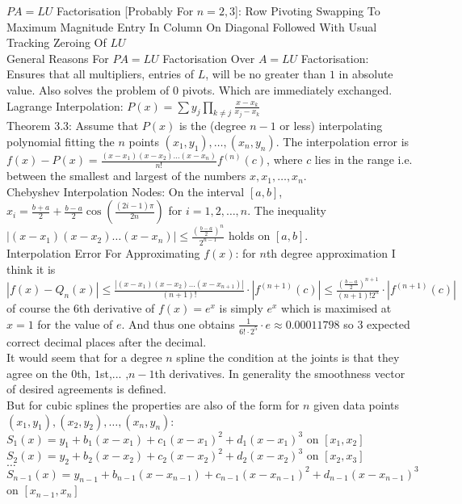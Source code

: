 $PA=LU$ Factorisation [Probably For $n=2,3$]: Row Pivoting Swapping To Maximum Magnitude Entry In Column On Diagonal Followed With Usual Tracking Zeroing Of $LU$ \\
General Reasons For $PA=LU$ Factorisation Over $A=LU$ Factorisation: \\
Ensures that all multipliers, entries of $L$, will be no greater than $1$ in absolute value. Also solves the problem of $0$ pivots. Which are immediately exchanged. \\
Lagrange Interpolation: $P(x) = \sum y_j \prod_{k \neq j} \frac{x-x_k}{x_j-x_k}$ \\
Theorem 3.3: Assume that $P(x)$ is the (degree $n-1$ or less) interpolating polynomial fitting the $n$ points $(x_1,y_1),\dots,(x_n,y_n)$. The interpolation error is $f(x)-P(x) = \frac{(x-x_1)(x-x_2)\dots (x-x_n)}{n!} f^{(n)}(c)$, where $c$ lies in the range i.e. between the smallest and largest of the numbers $x,x_1,\dots,x_n$. \\
Chebyshev Interpolation Nodes: On the interval $[a,b]$, $x_i = \frac{b+a}{2} + \frac{b-a}{2} \cos \left( \frac{(2 i-1)\pi}{2n} \right)$ for $i=1,2,\dots ,n$. The inequality $|(x-x_1)(x-x_2) \dots (x-x_n)| \le \frac{ \left( \frac{b-a}{2} \right)^n }{2^{n-1}}$ holds on $[a,b]$. \\
Interpolation Error For Approximating $f(x)$: for $n$th degree approximation I think it is $|f(x)-Q_n(x)| \le \frac{|(x-x_1)(x-x_2) \dots (x-x_{n+1})|}{(n+1)!} \cdot |f^{(n+1)}(c)| \le \frac{\left( \frac{b-a}{2} \right)^{n+1}}{(n+1)! 2^n} \cdot |f^{(n+1)}(c)|$ of course the $6$th derivative of $f(x)=e^x$ is simply $e^x$ which is maximised at $x=1$ for the value of $e$. And thus one obtains $\frac{1}{6! \cdot 2^5} \cdot e \approx 0.00011798$ so $3$ expected correct decimal places after the decimal. \\
It would seem that for a degree $n$ spline the condition at the joints is that they agree on the $0$th, $1$st,... ,$n-1$th derivatives. In generality the smoothness vector of desired agreements is defined. \\
But for cubic splines the properties are also of the form for $n$ given data points $(x_1,y_1),(x_2,y_2),\dots,(x_n,y_n)$: \\
$S_1(x)=y_1+b_1(x-x_1)+c_1(x-x_1)^2+d_1 (x-x_1)^3$ on $[x_1,x_2]$ \\
$S_2(x)=y_2+b_2(x-x_2)+c_2(x-x_2)^2+d_2 (x-x_2)^3$ on $[x_2,x_3]$ \\
$\dots $ \\
$S_{n-1}(x)=y_{n-1}+b_{n-1}(x-x_{n-1})+c_{n-1}(x-x_{n-1})^2+d_{n-1}(x-x_{n-1})^3$ on $[x_{n-1},x_n]$ \\
